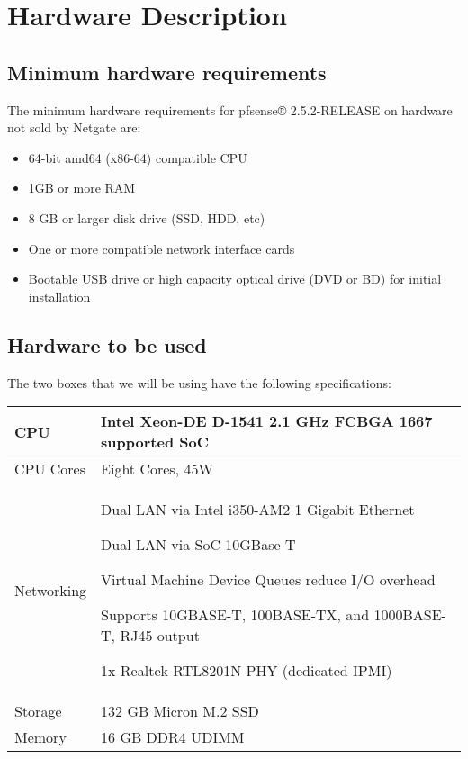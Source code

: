 \section{Hardware Description}

\subsection{Minimum hardware requirements}
The minimum hardware requirements for pfsense® 2.5.2-RELEASE on hardware not sold by Netgate are:


\begin{itemize}
    \item 64-bit amd64 (x86-64) compatible CPU
    \item 1GB or more RAM
    \item 8 GB or larger disk drive (SSD, HDD, etc)
    \item One or more compatible network interface cards
    \item Bootable USB drive or high capacity optical drive (DVD or BD) for initial installation
\end{itemize}

\subsection{Hardware to be used}
The two boxes that we will be using have the following specifications: 


\begin{table}[h]
    \begin{center}
    \begin{tabular}{ | m{5cm} | m{12cm} | }
    \hline CPU & Intel Xeon-DE D-1541 2.1 GHz FCBGA 1667 supported SoC \\ \hline
    CPU Cores & Eight Cores, 45W \\ \hline
    Networking & 
    \begin{description} 
        \item Dual LAN via Intel i350-AM2 1 Gigabit Ethernet
        \item Dual LAN via SoC 10GBase-T
        \item Virtual Machine Device Queues reduce I/O overhead
        \item Supports 10GBASE-T, 100BASE-TX, and 1000BASE-T, RJ45 output
        \item 1x Realtek RTL8201N PHY (dedicated IPMI) \end{description} \\ \hline
    Storage & 132 GB Micron M.2 SSD \\ \hline
    Memory & 16 GB DDR4 UDIMM \\ \hline
    \end{tabular}
    \end{center}
\end{table} 


